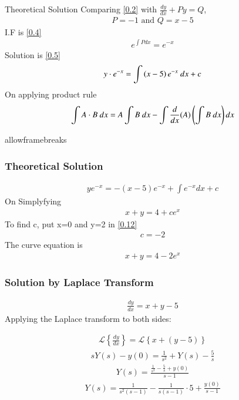 \documentclass{beamer}
\begin{document}
\begin{frame}{Theoretical Solution}
Comparing \ref{0.2} with $\frac{dy}{dx} + Py = Q$, 
  \begin{align}
      P=-1 \text{ and } Q = x-5
  \end{align}
I.F is \ref{0.4}
  \begin{align}
       e^{\int P dx} = e^ {-x}
    \label{0.4}
  \end{align}
Solution is \ref{0.5}
\begin{align}
    y \cdot e^{-x} = \int \left(x-5\right) e^{-x} \text{ }dx +c 
    \label{0.5}
\end{align}
On applying product rule
\begin{align}
    \int A\cdot B \text{ }dx = A \int B \text{ }dx - \int \frac{d}{dx}(A)\left(\int B \text{ }dx\right)dx
\end{align}
\end{frame}
\begin{frame}{allowframebreaks}
\frametitle{Theoretical Solution}
\begin{align}
    y e^{-x} = - (x-5)e^{-x} + \int e^{-x}  dx + c
\end{align}
On Simplyfying 
\begin{align}
     x+y = 4 + c e^x
    \label{0.12}
\end{align}
To find c, put x=0 and y=2 in \ref{0.12}
\begin{align}
     c = -2
\end{align}
The curve equation is 
\begin{align}
    x+y = 4 -2e^x
\end{align}
\end{frame}
\begin{frame}
\frametitle{Solution by Laplace Transform}
\begin{align}
    \frac{dy}{dx} = x+y-5
\end{align}
Applying the Laplace transform to both sides:

\begin{align}
    \mathcal{L}\left\{\frac{dy}{dx}\right\} = \mathcal{L}\left\{x + (y - 5)\right\}
\end{align}
\begin{align}
    sY(s) - y(0) = \frac{1}{s^2} + Y(s) - \frac{5}{s}
\end{align}
\begin{align}
    Y(s) = \frac{\frac{1}{s^2} - \frac{5}{s} + y(0)}{s - 1}
\end{align}
\begin{align}
    Y(s) = \frac{1}{s^2 (s - 1)} - \frac{1}{s (s - 1)} \cdot 5 + \frac{y(0)}{s - 1}
\end{align}
\end{frame}
\end{document}
